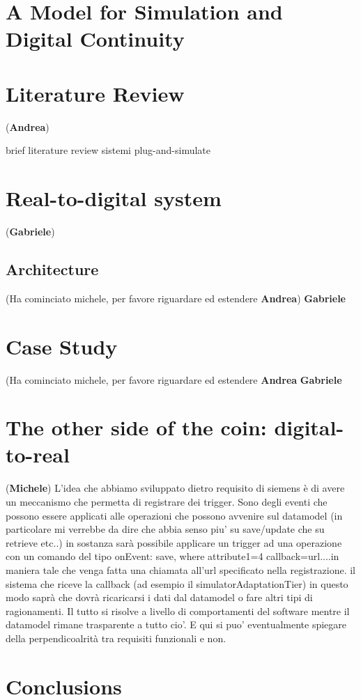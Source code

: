 \documentclass{riverk}
\begin{document}
\section{A Model for Simulation and Digital Continuity}


\section{Literature Review}
(\textbf{Andrea})

brief literature review sistemi plug-and-simulate


\section{Real-to-digital system}
(\textbf{Gabriele})


\subsection{Architecture}
(Ha cominciato michele, per favore riguardare ed estendere \textbf{Andrea}) \textbf{Gabriele}




\section{Case Study}
(Ha cominciato michele, per favore riguardare ed estendere \textbf{Andrea} \textbf{Gabriele}


\section{The other side of the coin: digital-to-real}
(\textbf{Michele})
L'idea che abbiamo sviluppato dietro requisito di siemens è di avere un meccanismo che permetta di registrare 
dei trigger. Sono degli eventi che possono essere applicati alle operazioni che possono avvenire sul datamodel (in particolare mi verrebbe da dire che abbia senso piu' su save/update che su retrieve etc..) in sostanza sarà possibile applicare un trigger ad una operazione con un comando del tipo  onEvent: save, where attribute1=4 callback=url....in maniera tale che venga fatta una chiamata all'url specificato nella registrazione. il sistema che riceve la callback (ad esempio il simulatorAdaptationTier) in questo modo saprà che dovrà ricaricarsi i dati dal datamodel o fare altri tipi di ragionamenti. 
Il tutto si risolve a livello di comportamenti del software mentre il datamodel rimane trasparente a tutto cio'. E qui si puo' eventualmente spiegare della perpendicoalrità tra requisiti funzionali e non.



\section{Conclusions}







\end{document}
